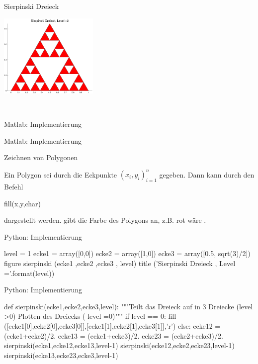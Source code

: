 \documentclass[hyperref={xetex}]{beamer}
\begin{document}
\begin{frame}[fragile]{Sierpinski Dreieck}
\begin{minipage}{5cm}
\end{minipage} \hfill
\begin{minipage}{5cm}
\includegraphics[height=4cm]{figures/sierpinski_3}
\end{minipage} \\
\end{frame}
%
%
\begin{frame}[fragile]{Matlab: Implementierung}
\end{frame}
\begin{frame}[fragile]{Matlab: Implementierung}
\end{frame}
% 
% 
\begin{frame}[fragile]{Zeichnen von Polygonen}

Ein Polygon sei durch die Eckpunkte $(x_i,y_i)_{i=1}^n$ gegeben. Dann
kann durch den Befehl
\begin{matlabin}
fill(x,y,char)
\end{matlabin}
dargestellt werden.  gibt die Farbe des Polygons an, z.B. rot
wäre .
\end{frame}
%
%
\begin{frame}[fragile]{Python: Implementierung}
  \begin{pyin}
level = 1
ecke1 = array([0,0])
ecke2 = array([1,0])
ecke3 = array([0.5, sqrt(3)/2])
figure
sierpinski (ecke1 ,ecke2 ,ecke3 , level)
title ('Sierpinski Dreieck , Level ={}'.format(level))    
  \end{pyin}
\end{frame}
\begin{frame}[fragile]{Python: Implementierung}
  \begin{pyin}
def sierpinski(ecke1,ecke2,ecke3,level):
    """Teilt das Dreieck auf in 3 Dreiecke (level >0) 
    Plotten des Dreiecks ( level =0)"""
    if level == 0:
        fill ([ecke1[0],ecke2[0],ecke3[0]],[ecke1[1],ecke2[1],ecke3[1]],'r')
    else:
        ecke12 = (ecke1+ecke2)/2.
        ecke13 = (ecke1+ecke3)/2.
        ecke23 = (ecke2+ecke3)/2.
        sierpinski(ecke1,ecke12,ecke13,level-1)
        sierpinski(ecke12,ecke2,ecke23,level-1)
        sierpinski(ecke13,ecke23,ecke3,level-1)    
  \end{pyin}
\end{frame}
\end{document}
